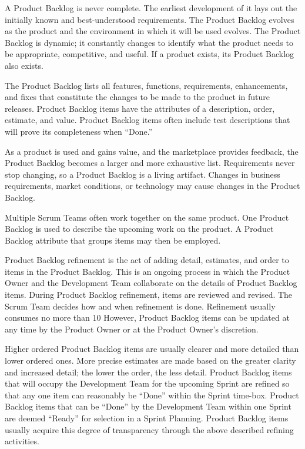 A Product Backlog is never complete. The earliest development of it lays out the initially known
and best-understood requirements. The Product Backlog evolves as the product and the
environment in which it will be used evolves. The Product Backlog is dynamic; it constantly
changes to identify what the product needs to be appropriate, competitive, and useful. If a
product exists, its Product Backlog also exists.

The Product Backlog lists all features, functions, requirements, enhancements, and fixes that
constitute the changes to be made to the product in future releases. Product Backlog items have
the attributes of a description, order, estimate, and value. Product Backlog items often include
test descriptions that will prove its completeness when ``Done.''

As a product is used and gains value, and the marketplace provides feedback, the Product
Backlog becomes a larger and more exhaustive list. Requirements never stop changing, so a
Product Backlog is a living artifact. Changes in business requirements, market conditions, or
technology may cause changes in the Product Backlog.

Multiple Scrum Teams often work together on the same product. One Product Backlog is used
to describe the upcoming work on the product. A Product Backlog attribute that groups items
may then be employed.

Product Backlog refinement is the act of adding detail, estimates, and order to items in the
Product Backlog. This is an ongoing process in which the Product Owner and the Development
Team collaborate on the details of Product Backlog items. During Product Backlog refinement,
items are reviewed and revised. The Scrum Team decides how and when refinement is done.
Refinement usually consumes no more than 10%
However, Product Backlog items can be updated at any time by the Product Owner or at the
Product Owner's discretion.

Higher ordered Product Backlog items are usually clearer and more detailed than lower ordered
ones. More precise estimates are made based on the greater clarity and increased detail; the
lower the order, the less detail. Product Backlog items that will occupy the Development Team
for the upcoming Sprint are refined so that any one item can reasonably be ``Done'' within the
Sprint time-box. Product Backlog items that can be ``Done'' by the Development Team within
one Sprint are deemed ``Ready'' for selection in a Sprint Planning. Product Backlog items usually
acquire this degree of transparency through the above described refining activities.

